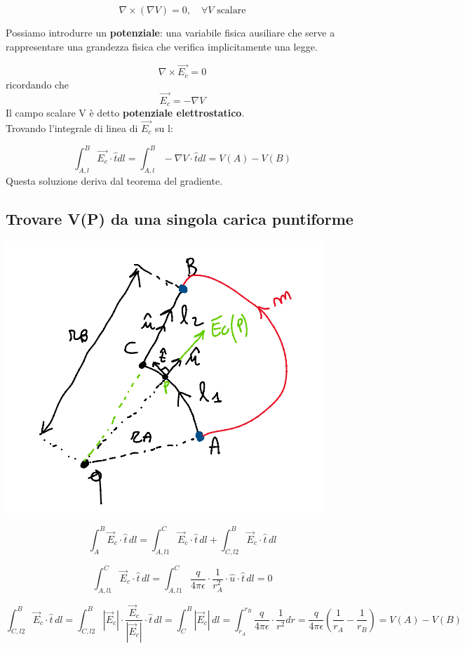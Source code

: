 \[
\nabla \times (\nabla V) = 0, \quad \forall V \text{ scalare}
\]

Possiamo introdurre un \textbf{potenziale}: una variabile fisica ausiliare che serve a rappresentare una grandezza fisica che verifica implicitamente una legge.

\[
\nabla \times \vec{E_c} = 0
\]
ricordando che 
\[
    \vec{E_c} = -\nabla V
\]
Il campo scalare V è detto \textbf{potenziale elettrostatico}.\\
Trovando l'integrale di linea di $\vec{E_c}$ su l:

\[
\int_{A,l}^B \vec{E_c} \cdot \hat{t} dl = \int_{A,l}^B -\nabla V \cdot \hat{t} dl = V(A) - V(B)
\]
Questa soluzione deriva dal teorema del gradiente.

\subsection{Trovare V(P) da una singola carica puntiforme}

\begin{center}
    \includegraphics[scale = 0.7]{immagini/image10.png}
\end{center}

\[
\int_{A}^{B} \vec{E}_c \cdot \hat{t}  \, dl = \int_{A,l1}^{C} \vec{E}_c \cdot \hat{t}  \, dl + \int_{C,l2}^{B}\vec{E}_c \cdot \hat{t}  \, dl
\]

\[
\int_{A,l1}^{C} \vec{E}_c \cdot \hat{t}  \, dl = \int_{A,l1}^{C} \frac{q}{4 \pi \epsilon} \cdot \frac{1}{r^2_A} \cdot \hat{u} \cdot\hat{t}  \, dl = 0
\]

\[
\int_{C,l2}^{B} \vec{E}_c \cdot \hat{t}  \, dl = \int_{C,l2}^{B} |\vec{E}_c| \cdot \frac{\vec{E}_c}{|\vec{E}_c|} \cdot \hat{t}  \, dl = \int_{C}^{B} |\vec{E}_c|  \, dl = \int_{r_A}^{r_B} \frac{q}{4 \pi \epsilon} \cdot \frac{1}{r^2} dr = \frac{q}{4\pi\epsilon}(\frac{1}{r_A}-\frac{1}{r_B}) = V(A)-V(B)
\]

